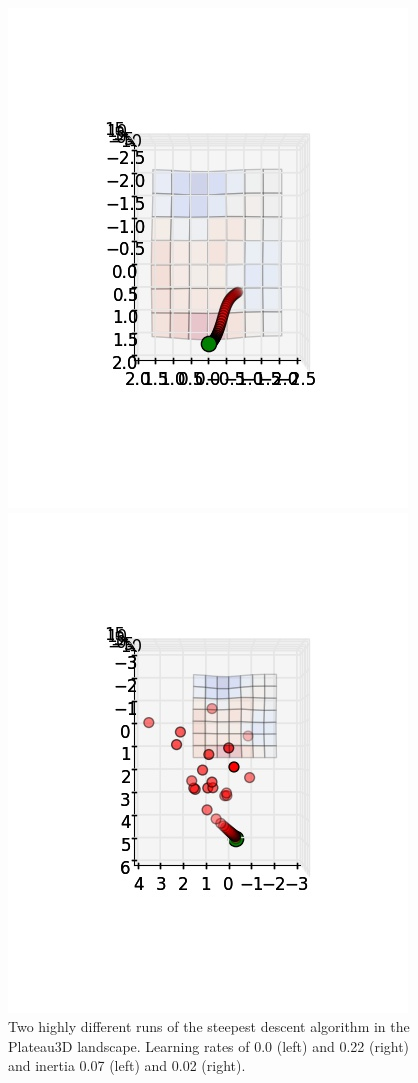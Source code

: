 \documentclass{scrartcl}
\begin{document}
\begin{figure}[H]
\centering
\begin{minipage}{.5\textwidth}
  \centering
  \includegraphics[width=.8\linewidth]{img/ex1/runs/SD-Plateau3D_0_0,07.jpg}
\end{minipage}%
\begin{minipage}{.5\textwidth}
  \centering
  \includegraphics[width=.8\linewidth]{img/ex1/runs/SD-Plateau3D_0,22_0,02.jpg}
\end{minipage}
\caption{Two highly different runs of the steepest descent algorithm in the Plateau3D landscape. Learning rates of 0.0 (left) and 0.22 (right) and inertia 0.07 (left) and 0.02 (right).}
\label{fig:plateau}
\end{figure}
\end{document}
